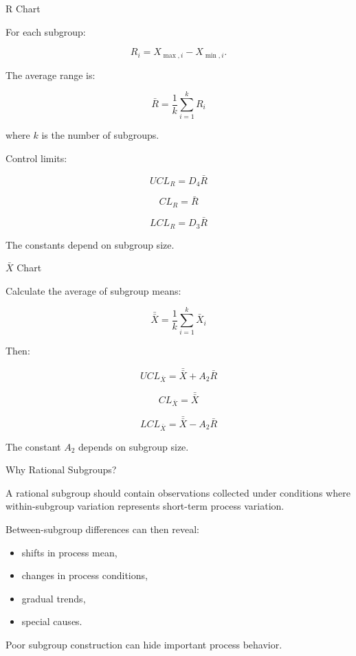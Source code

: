 \documentclass[aspectratio=169,10pt]{beamer}
\begin{document}

\begin{frame}[shrink=18]{R Chart}
\small

For each subgroup:

\[
R_i=X_{\max,i}-X_{\min,i}.
\]

The average range is:

\[
\boxed{
\bar R=
\frac{1}{k}
\sum_{i=1}^{k}R_i
}
\]

where \(k\) is the number of subgroups.

Control limits:

\[
\boxed{
UCL_R=D_4\bar R
}
\]

\[
\boxed{
CL_R=\bar R
}
\]

\[
\boxed{
LCL_R=D_3\bar R
}
\]

The constants depend on subgroup size.

\end{frame}


\begin{frame}[shrink=18]{$\bar X$ Chart}
\small

Calculate the average of subgroup means:

\[
\boxed{
\bar{\bar X}
=
\frac{1}{k}
\sum_{i=1}^{k}\bar X_i
}
\]

Then:

\[
\boxed{
UCL_{\bar X}
=
\bar{\bar X}
+
A_2\bar R
}
\]

\[
\boxed{
CL_{\bar X}
=
\bar{\bar X}
}
\]

\[
\boxed{
LCL_{\bar X}
=
\bar{\bar X}
-
A_2\bar R
}
\]

The constant \(A_2\) depends on subgroup size.

\end{frame}


\begin{frame}[shrink=18]{Why Rational Subgroups?}
\small

A rational subgroup should contain observations collected under
conditions where within-subgroup variation represents short-term
process variation.

Between-subgroup differences can then reveal:

\begin{itemize}
    \item shifts in process mean,
    \item changes in process conditions,
    \item gradual trends,
    \item special causes.
\end{itemize}

Poor subgroup construction can hide important process behavior.

\end{frame}
\end{document}
